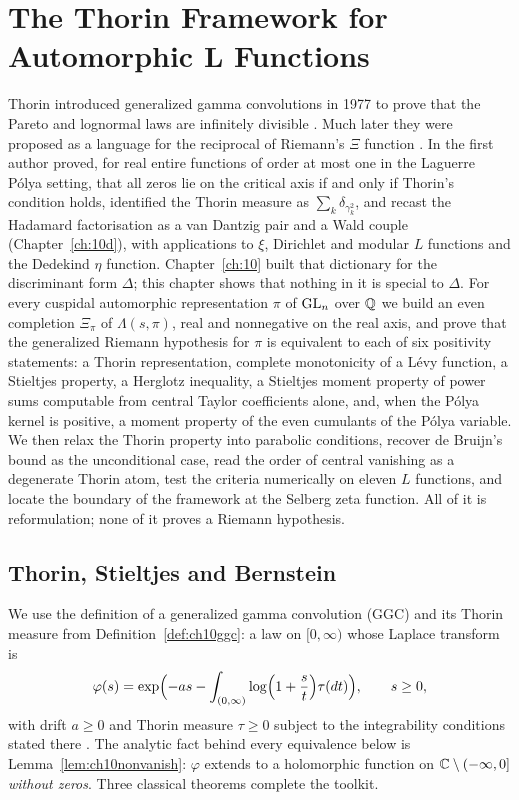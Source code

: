 \chapter{The Thorin Framework for Automorphic L Functions}\label{ch:10b}

Thorin introduced generalized gamma convolutions in 1977 to prove that the Pareto and lognormal laws are infinitely divisible \cite{thorin1977,thorin1977b}. Much later they were proposed as a language for the reciprocal of Riemann's $\Xi$ function \cite{polson2017}. In \cite{polson2018vdp} the first author proved, for real entire functions of order at most one in the Laguerre P\'olya setting, that all zeros lie on the critical axis if and only if Thorin's condition holds, identified the Thorin measure as $\sum_k\delta_{\gamma_k^2}$, and recast the Hadamard factorisation as a van Dantzig pair and a Wald couple (Chapter~\ref{ch:10d}), with applications to $\xi$, Dirichlet and modular $L$ functions and the Dedekind $\eta$ function. Chapter~\ref{ch:10} built that dictionary for the discriminant form $\Delta$; this chapter shows that nothing in it is special to $\Delta$. For every cuspidal automorphic representation $\pi$ of $\mathrm{GL}_n$ over $\mathbb{Q}$ we build an even completion $\Xi_\pi$ of $\Lambda(s,\pi)$, real and nonnegative on the real axis, and prove that the generalized Riemann hypothesis for $\pi$ is equivalent to each of six positivity statements: a Thorin representation, complete monotonicity of a L\'evy function, a Stieltjes property, a Herglotz inequality, a Stieltjes moment property of power sums computable from central Taylor coefficients alone, and, when the P\'olya kernel is positive, a moment property of the even cumulants of the P\'olya variable. We then relax the Thorin property into parabolic conditions, recover de Bruijn's bound as the unconditional case, read the order of central vanishing as a degenerate Thorin atom, test the criteria numerically on eleven $L$ functions, and locate the boundary of the framework at the Selberg zeta function. All of it is reformulation; none of it proves a Riemann hypothesis.

\section{Thorin, Stieltjes and Bernstein}

We use the definition of a generalized gamma convolution (GGC) and its Thorin measure from Definition~\ref{def:ch10ggc}: a law on $[0,\infty)$ whose Laplace transform is
\begin{equation}\label{eq:10bggc}
\varphi(s) = \exp\Bigl(-as-\int_{(0,\infty)}\log\Bigl(1+\frac st\Bigr)\tau(dt)\Bigr),\qquad s\ge0,
\end{equation}
with drift $a\ge0$ and Thorin measure $\tau\ge0$ subject to the integrability conditions stated there \cite{thorin1977,bondesson1992}. The analytic fact behind every equivalence below is Lemma~\ref{lem:ch10nonvanish}: $\varphi$ extends to a holomorphic function on $\mathbb{C}\setminus(-\infty,0]$ \emph{without zeros}. Three classical theorems complete the toolkit.

